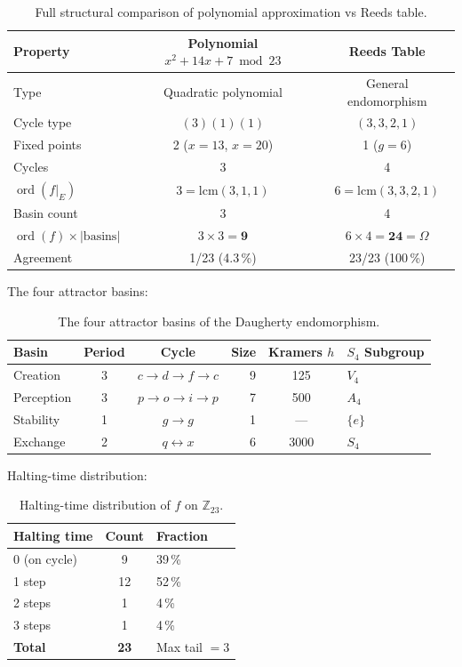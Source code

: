 \documentclass[11pt,a4paper]{article}
\theoremstyle{plain}
\theoremstyle{remark}
\renewcommand{\Omega}{\varOmega}
\newcommand{\Z}{\mathbb{Z}}
\newcommand{\ord}{\operatorname{ord}}
\begin{document}
\begin{table}[H]
\centering\small
\begin{tabular}{@{}lcc@{}}
\toprule
Property & Polynomial $x^2\!+14x+7\bmod 23$ & Reeds Table\\
\midrule
Type               & Quadratic polynomial     & General endomorphism\\
Cycle type         & $(3)(1)(1)$              & $(3,3,2,1)$\\
Fixed points       & 2 ($x=13$, $x=20$)      & 1 ($g=6$)\\
Cycles             & 3                        & 4\\
$\ord(f|_E)$ & $3=\mathrm{lcm}(3,1,1)$ & $6=\mathrm{lcm}(3,3,2,1)$\\
Basin count        & 3                        & 4\\
$\ord(f)\times|\mathrm{basins}|$
                   & $3\times 3=\mathbf{9}$   & $6\times 4=\mathbf{24}=\Omega$\\
Agreement          & 1/23 (4.3\,\%)           & 23/23 (100\,\%)\\
\bottomrule
\end{tabular}
\caption{Full structural comparison of polynomial approximation vs Reeds table.}
\label{tab:full-comparison}
\end{table}

\noindent The four attractor basins:

\begin{table}[H]
\centering
\begin{tabular}{@{}lccrcl@{}}
\toprule
Basin & Period & Cycle & Size & Kramers $h$ & $S_4$ Subgroup\\
\midrule
Creation   & 3 & $c\!\to\!d\!\to\!f\!\to\!c$  & 9 & 125  & $V_4$\\
Perception & 3 & $p\!\to\!o\!\to\!i\!\to\!p$  & 7 & 500  & $A_4$\\
Stability  & 1 & $g\!\to\!g$                   & 1 & ---  & $\{e\}$\\
Exchange   & 2 & $q\!\leftrightarrow\!x$       & 6 & 3000 & $S_4$\\
\bottomrule
\end{tabular}
\caption{The four attractor basins of the Daugherty endomorphism.}
\label{tab:basins}
\end{table}

\noindent Halting-time distribution:

\begin{table}[H]
\centering
\begin{tabular}{@{}lcl@{}}
\toprule
Halting time & Count & Fraction\\
\midrule
0 (on cycle) & 9  & 39\,\%\\
1 step       & 12 & 52\,\%\\
2 steps      & 1  & 4\,\%\\
3 steps      & 1  & 4\,\%\\
\midrule
\textbf{Total} & \textbf{23} & Max tail $=3$\\
\bottomrule
\end{tabular}
\caption{Halting-time distribution of $f$ on $\Z_{23}$.}
\label{tab:halting}
\end{table}
\end{document}

